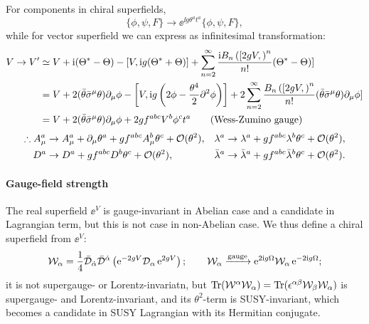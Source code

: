 \documentclass[CheatSheet]{subfiles}
\newcommand{\OD}{{\mathcal D}}
\begin{document}
For components in chiral superfields,
\begin{equation}
   \{\phi,\psi,F\}\to \ee^{\ii g \theta^at^a}\{\phi,\psi,F\},
\end{equation}
while for vector superfield we can express as infinitesimal transformation:
\begin{align}
 V\to V'
&\simeq
V + \mathrm{i} (\Theta^*-\Theta)
 - [V,\mathrm{i} g(\Theta^*+\Theta)]+
 \sum_{n=2}^{\infty}\frac{\mathrm{i} B_n\left([2gV,\right)^n}{n!} (\Theta^*-\Theta)]
\\&=
V +2(\bar\theta\bar\sigma^{\mu}\theta)\partial_{\mu}\phi
 - \left[V,\mathrm{i} g\left(2\phi-\frac{\theta^4}2\partial^2\phi\right)\right]
 +2\sum_{n=2}^{\infty}\frac{B_n\left([2gV,\right)^n}{n!}(\bar\theta\bar\sigma^{\mu}\theta)\partial_{\mu}\phi]
\\&=
V +2(\bar\theta\bar\sigma^{\mu}\theta)\partial_{\mu}\phi
 +2 g f^{abc}V^b\phi^ct^a
\qquad\text{(Wess-Zumino gauge)}
\end{align}
\begin{equation}
\begin{split}
   \therefore A_\mu^a&\to A^a_\mu+\partial_\mu \theta^a
   + g f^{abc}A_\mu^b\theta^c  + \operatorname{\mathcal{O}}(\theta^2),
 &\lambda^a&\to\lambda^a+gf^{abc}\lambda^b\theta^c+\operatorname{\mathcal{O}}(\theta^2),
 \\
 D^a&\to D^a+gf^{abc}D^b\theta^c+\operatorname{\mathcal{O}}(\theta^2),
& \bar\lambda^a&\to\bar\lambda^a+gf^{abc}\bar\lambda^b\theta^c + \operatorname{\mathcal{O}}(\theta^2).
\end{split}
\end{equation}
\paragraph{Gauge-field strength}
The real superfield $\ee^{V}$ is gauge-invariant in Abelian case and a candidate in Lagrangian term, but this is not case in non-Abelian case.
We thus define a chiral superfield from $\ee^{V}$:
\begin{equation}
 \mathcal W_\alpha = \frac14\bar\OD_\dalpha\bar\OD^\dalpha\left(\ee^{-2gV}\OD_\alpha\ee^{2gV}\right);
\qquad
\mathcal W_\alpha\xrightarrow{\text{gauge}}
\ee^{2\ii g \Omega}\mathcal W_{\alpha}\ee^{-2\ii g \Omega};
\end{equation}
it is not supergauge- or Lorentz-invariatn, but $\operatorname{\mathrm{Tr}}(\mathcal W^\alpha \mathcal W_\alpha) = \operatorname{\mathrm{Tr}}(\epsilon^{\alpha\beta}\mathcal W_\beta \mathcal W_\alpha)$ is supergauge- and Lorentz-invariant, and its $\theta^2$-term is SUSY-invariant, which becomes a candidate in SUSY Lagrangian with its Hermitian conjugate.
\end{document}
